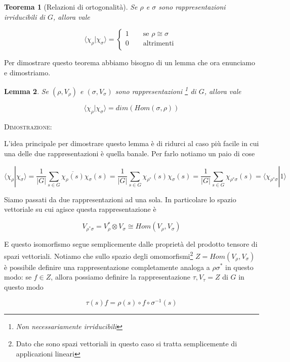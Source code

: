 \documentclass[11pt]{article}
\theoremstyle{plain}
\newtheorem{thm}{Teorema}[section]
\newtheorem{lemma}[thm]{Lemma}
\theoremstyle{definition}
\theoremstyle{remark}
\newcommand{\dsum}{\displaystyle\sum}
\begin{document}
\begin{thm}[Relazioni di ortogonalità]
Se $\rho$ e $\sigma$ sono rappresentazioni irriducibili di $G$, allora vale

\[\langle \chi_{\rho}|\chi_{\sigma} \rangle = \begin{cases}
1 \qquad \text{se } \rho \cong \sigma \\
0 \qquad \text{altrimenti }\\
\end{cases} \]
\label{relazione di ortogonalita}
\end{thm}

Per dimostrare questo teorema abbiamo bisogno di un lemma che ora enunciamo e dimostriamo.




\begin{lemma}
Se $(\rho, V_\rho)$ e $(\sigma, V_\sigma)$ sono rappresentazioni \footnote{Non necessariamente irriducibili} di $G$, allora vale

\[ \langle \chi_\rho | \chi_\sigma \rangle  = dim(Hom (\sigma, \rho))\] 
\label{lemma relazioni ortogonalita}
\end{lemma}
\textsc{Dimostrazione:}

L'idea principale per dimostrare questo lemma è di ridurci al caso più facile in cui una delle due rappresentazioni è quella banale. Per farlo notiamo un paio di cose

\[ \langle \chi_\rho | \chi_\sigma \rangle = \dfrac{1}{|G|} \dsum_{s\in G} \overline{\chi_\rho(s)} \chi_\sigma(s) = \dfrac{1}{|G|} \dsum_{s\in G} {\chi_{\rho^*}(s)} \chi_\sigma(s) = \dfrac{1}{|G|} \dsum_{s\in G} \chi_{\rho^*\sigma}(s)  = \langle \chi_{\rho^*\sigma}  | 1 \rangle\]

Siamo passati da due rappresentazioni ad una sola. In particolare lo spazio vettoriale su cui agisce questa rappresentazione è 

\[ V_{\rho^* \sigma} = V_{\rho}^* \otimes V_\sigma \cong Hom(V_\rho, V_\sigma)\]

E questo isomorfismo segue semplicemente dalle proprietà del prodotto tensore di spazi vettoriali. Notiamo che sullo spazio degli omomorfismi\footnote{Dato che sono spazi vettoriali in questo caso si tratta semplicemente di applicazioni lineari} $Z = Hom(V_\rho, V_\sigma)$ è possibile definire una rappresentazione completamente analoga a $\rho\sigma^*$ in questo modo: se $f \in Z$, allora possiamo definire la rappresentazione $\tau, V_\tau = Z$ di $G$ in questo modo

\[ \tau(s)f = \rho(s) \circ f \circ \sigma^{-1}(s)\]
\end{document}
